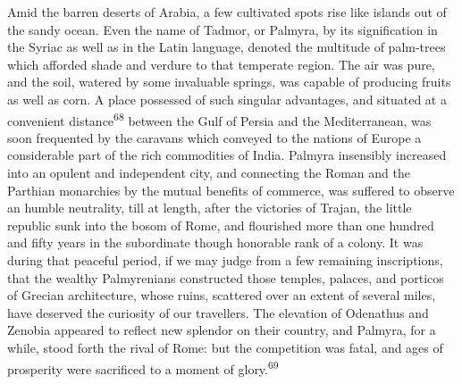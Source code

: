 Amid the barren deserts of Arabia, a few cultivated spots rise
like islands out of the sandy ocean. Even the name of Tadmor, or
Palmyra, by its signification in the Syriac as well as in the
Latin language, denoted the multitude of palm-trees which
afforded shade and verdure to that temperate region. The air was
pure, and the soil, watered by some invaluable springs, was
capable of producing fruits as well as corn. A place possessed of
such singular advantages, and situated at a convenient distance\textsuperscript{68}
between the Gulf of Persia and the Mediterranean, was soon
frequented by the caravans which conveyed to the nations of
Europe a considerable part of the rich commodities of India.
Palmyra insensibly increased into an opulent and independent
city, and connecting the Roman and the Parthian monarchies by the
mutual benefits of commerce, was suffered to observe an humble
neutrality, till at length, after the victories of Trajan, the
little republic sunk into the bosom of Rome, and flourished more
than one hundred and fifty years in the subordinate though
honorable rank of a colony. It was during that peaceful period,
if we may judge from a few remaining inscriptions, that the
wealthy Palmyrenians constructed those temples, palaces, and
porticos of Grecian architecture, whose ruins, scattered over an
extent of several miles, have deserved the curiosity of our
travellers. The elevation of Odenathus and Zenobia appeared to
reflect new splendor on their country, and Palmyra, for a while,
stood forth the rival of Rome: but the competition was fatal, and
ages of prosperity were sacrificed to a moment of glory.\textsuperscript{69}



